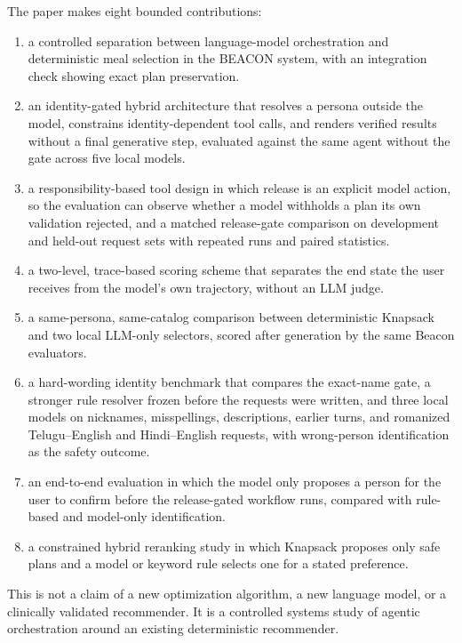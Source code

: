 \documentclass[
  10pt,
  letterpaper,
]{article}
\providecommand{\tightlist}{%
  \setlength{\itemsep}{0pt}\setlength{\parskip}{0pt}}
\begin{document}
The paper makes eight bounded contributions:

\begin{enumerate}
\def\labelenumi{\arabic{enumi}.}
\tightlist
\item
  a controlled separation between language-model orchestration and
  deterministic meal selection in the BEACON system, with an integration
  check showing exact plan preservation.
\item
  an identity-gated hybrid architecture that resolves a persona outside
  the model, constrains identity-dependent tool calls, and renders
  verified results without a final generative step, evaluated against
  the same agent without the gate across five local models.
\item
  a responsibility-based tool design in which release is an explicit
  model action, so the evaluation can observe whether a model withholds
  a plan its own validation rejected, and a matched release-gate
  comparison on development and held-out request sets with repeated runs
  and paired statistics.
\item
  a two-level, trace-based scoring scheme that separates the end state
  the user receives from the model's own trajectory, without an LLM
  judge.
\item
  a same-persona, same-catalog comparison between deterministic Knapsack
  and two local LLM-only selectors, scored after generation by the same
  Beacon evaluators.
\item
  a hard-wording identity benchmark that compares the exact-name gate, a
  stronger rule resolver frozen before the requests were written, and
  three local models on nicknames, misspellings, descriptions, earlier
  turns, and romanized Telugu--English and Hindi--English requests, with
  wrong-person identification as the safety outcome.
\item
  an end-to-end evaluation in which the model only proposes a person for
  the user to confirm before the release-gated workflow runs, compared
  with rule-based and model-only identification.
\item
  a constrained hybrid reranking study in which Knapsack proposes only
  safe plans and a model or keyword rule selects one for a stated
  preference.
\end{enumerate}

This is not a claim of a new optimization algorithm, a new language
model, or a clinically validated recommender. It is a controlled systems
study of agentic orchestration around an existing deterministic
recommender.
\end{document}
